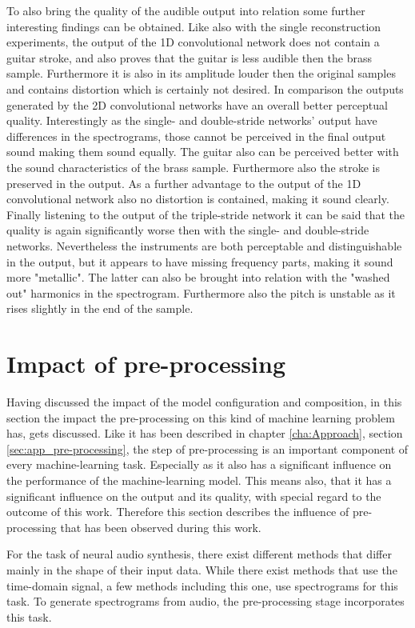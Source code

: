 To also bring the quality of the audible output into relation some further interesting findings can be obtained. Like also with the single reconstruction experiments, the output of the 1D convolutional network does not contain a guitar stroke, and also proves that the guitar is less audible then the brass sample. Furthermore it is also in its amplitude louder then the original samples and contains distortion which is certainly not desired. In comparison the outputs generated by the 2D convolutional networks have an overall better perceptual quality. Interestingly as the single- and double-stride networks' output have differences in the spectrograms, those cannot be perceived in the final output sound making them sound equally. The guitar also can be perceived better with the sound characteristics of the brass sample. Furthermore also the stroke is preserved in the output. As a further advantage to the output of the 1D convolutional network also no distortion is contained, making it sound clearly. Finally listening to the output of the triple-stride network it can be said that the quality is again significantly worse then with the single- and double-stride networks. Nevertheless the instruments are both perceptable and distinguishable in the output, but it appears to have missing frequency parts, making it sound more "metallic". The latter can also be brought into relation with the "washed out" harmonics in the spectrogram. Furthermore also the pitch is unstable as it rises slightly in the end of the sample. 

\newpage
\section{Impact of pre-processing}
\label{sec:disc_imp_pre_processing}
Having discussed the impact of the model configuration and composition, in this section the impact the pre-processing on this kind of machine learning problem has, gets discussed. Like it has been described in chapter \ref{cha:Approach}, section \ref{sec:app_pre-processing}, the step of pre-processing is an important component of every machine-learning task. Especially as it also has a significant influence on the performance of the machine-learning model. This means also, that it has a significant influence on the output and its quality, with special regard to the outcome of this work. Therefore this section describes the influence of pre-processing that has been observed during this work. 

For the task of neural audio synthesis, there exist different methods that differ mainly in the shape of their input data. While there exist methods that use the time-domain signal, a few methods including this one, use spectrograms for this task. To generate spectrograms from audio, the pre-processing stage incorporates this task. 


